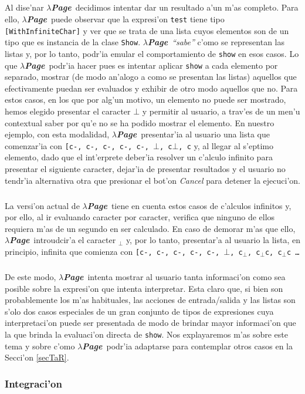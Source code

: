 \documentclass[a4paper]{article}
\newcommand{\hpage}{\textbf{\textsl{$\lambda$Page}}}
\begin{document}
\subparagraph{}Al dise'nar \hpage\ decidimos intentar dar un resultado a'un m'as completo.  Para ello, \hpage\ puede observar que la expresi'on \texttt{test} tiene tipo \texttt{[WithInfiniteChar]} y ver que se trata de una lista cuyos elementos son de un tipo que es instancia de la clase \texttt{Show}.  \hpage\ \textsl{``sabe''} c'omo se representan las listas y, por lo tanto, podr'ia emular el comportamiento de \texttt{show} en esos casos.  Lo que \hpage\ podr'ia hacer pues es intentar aplicar \texttt{show} a cada elemento por separado, mostrar (de modo an'alogo a como se presentan las listas) aquellos que efectivamente puedan ser evaluados y exhibir de otro modo aquellos que no.  Para estos casos, en los que por alg'un motivo, un elemento no puede ser mostrado, hemos elegido presentar el caracter $\bot$ y permitir al usuario, a trav'es de un men'u contextual saber por qu'e no se ha podido mostrar el elemento.  En nuestro ejemplo, con esta modalidad, \hpage\ presentar'ia al usuario una lista que comenzar'ia con \texttt{[c-, c-, c-, c-, c-, $\bot$, c$\bot$, c} y, al llegar al s'eptimo elemento, dado que el int'erprete deber'ia resolver un c'alculo infinito para presentar el siguiente caracter, dejar'ia de presentar resultados y el usuario no tendr'ia alternativa otra que presionar el bot'on \textsl{Cancel} para detener la ejecuci'on.
\subparagraph{}La versi'on actual de \hpage\ tiene en cuenta estos casos de c'alculos infinitos y, por ello, al ir evaluando caracter por caracter, verifica que ninguno de ellos requiera m'as de un segundo en ser calculado.  En caso de demorar m'as que ello, \hpage\ introudcir'a el caracter  $_{\bot}$ y, por lo tanto, presentar'a al usuario la lista, en principio, infinita que comienza con \texttt{[c-, c-, c-, c-, c-, $\bot$, c$_{\bot}$, c$_{\bot}$c, c$_{\bot}$c \ldots}
\subparagraph{}De este modo, \hpage\ intenta mostrar al usuario tanta informaci'on como sea posible sobre la expresi'on que intenta interpretar.  Esta claro que, si bien son probablemente los m'as habituales, las acciones de entrada/salida y las listas son s'olo dos casos especiales de un gran conjunto de tipos de expresiones cuya interpretaci'on puede ser presentada de modo de brindar mayor informaci'on que la que brinda la evaluaci'on directa de \texttt{show}.  Nos explayaremos m'as sobre este tema y sobre c'omo \hpage\ podr'ia adaptarse para contemplar otros casos en la Secci'on \ref{secTaR}.

\subsubsection{Integraci'on}
\end{document}
